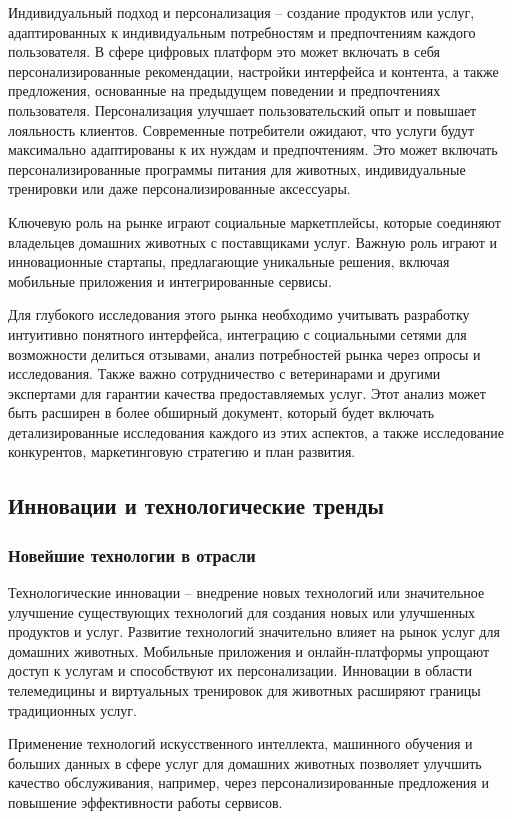 Индивидуальный подход и персонализация – создание продуктов или услуг, адаптированных к индивидуальным потребностям и предпочтениям каждого пользователя. В сфере цифровых платформ это может включать в себя персонализированные рекомендации, настройки интерфейса и контента, а также предложения, основанные на предыдущем поведении и предпочтениях пользователя. Персонализация улучшает пользовательский опыт и повышает лояльность клиентов. Современные потребители ожидают, что услуги будут максимально адаптированы к их нуждам и предпочтениям. Это может включать персонализированные программы питания для животных, индивидуальные тренировки или даже персонализированные аксессуары.

Ключевую роль на рынке играют социальные маркетплейсы, которые соединяют владельцев домашних животных с поставщиками услуг. Важную роль играют и инновационные стартапы, предлагающие уникальные решения, включая мобильные приложения и интегрированные сервисы.

Для глубокого исследования этого рынка необходимо учитывать разработку интуитивно понятного интерфейса, интеграцию с социальными сетями для возможности делиться отзывами, анализ потребностей рынка через опросы и исследования. Также важно сотрудничество с ветеринарами и другими экспертами для гарантии качества предоставляемых услуг. Этот анализ может быть расширен в более обширный документ, который будет включать детализированные исследования каждого из этих аспектов, а также исследование конкурентов, маркетинговую стратегию и план развития.
\subsection{Инновации и технологические тренды}
\subsubsection{Новейшие технологии в отрасли}

Технологические инновации – внедрение новых технологий или значительное улучшение существующих технологий для создания новых или улучшенных продуктов и услуг. Развитие технологий значительно влияет на рынок услуг для домашних животных. Мобильные приложения и онлайн-платформы упрощают доступ к услугам и способствуют их персонализации. Инновации в области телемедицины и виртуальных тренировок для животных расширяют границы традиционных услуг.

Применение технологий искусственного интеллекта, машинного обучения и больших данных в сфере услуг для домашних животных позволяет улучшить качество обслуживания, например, через персонализированные предложения и повышение эффективности работы сервисов.
